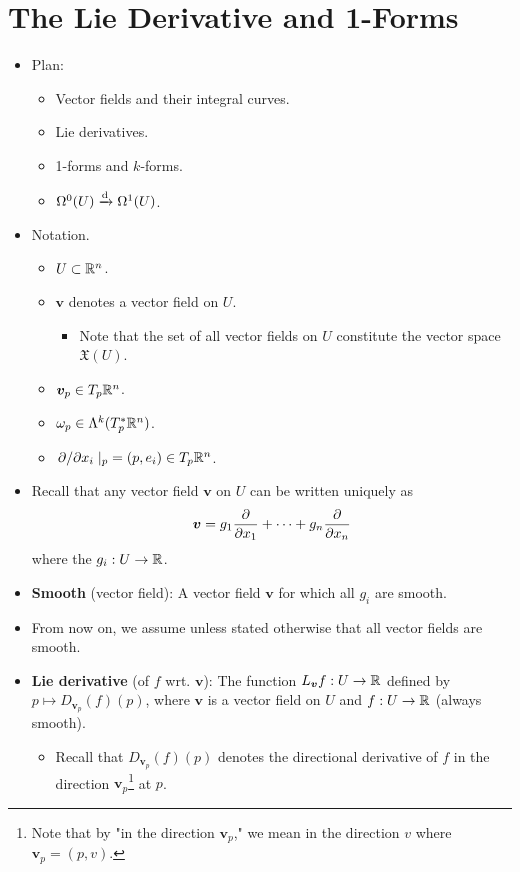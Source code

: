 \documentclass[../notes.tex]{subfiles}
\begin{document}
\section{The Lie Derivative and 1-Forms}
\begin{itemize}
    \item {}Plan:
    \begin{itemize}
        \item Vector fields and their integral curves.
        \item Lie derivatives.
        \item 1-forms and $k$-forms.
        \item $\ome[0]{U}\xrightarrow{\dd}\ome[1]{U}$.
    \end{itemize}
    \item Notation.
    \begin{itemize}
        \item $U\subset\R^n$.
        \item $\bm{v}$ denotes a vector field on $U$.
        \begin{itemize}
            \item Note that the set of all vector fields on $U$ constitute the vector space $\mathfrak{X}(U)$.
        \end{itemize}
        \item $\bm{v}_p\in T_p\R^n$.
        \item $\omega_p\in\lam[k]{T_p^*\R^n}$.
        \item $\pdv*{x_i}|_p=(p,e_i)\in T_p\R^n$.
    \end{itemize}
    \item Recall that any vector field $\bm{v}$ on $U$ can be written uniquely as
    \begin{equation*}
        \bm{v} = g_1\pdv{x_1}+\cdots+g_n\pdv{x_n}
    \end{equation*}
    where the $g_i:U\to\R$.
    \item \textbf{Smooth} (vector field): A vector field $\bm{v}$ for which all $g_i$ are smooth.
    \item From now on, we assume unless stated otherwise that all vector fields are smooth.
    \item \textbf{Lie derivative} (of $f$ wrt. $\bm{v}$): The function $L_{\bm{v}}f:U\to\R$ defined by $p\mapsto D_{\bm{v}_p}(f)(p)$, where $\bm{v}$ is a vector field on $U$ and $f:U\to\R$ (always smooth).
    \begin{itemize}
        \item Recall that $D_{\bm{v}_p}(f)(p)$ denotes the directional derivative of $f$ in the direction $\bm{v}_p$\footnote{Note that by "in the direction $\bm{v}_p$," we mean in the direction $v$ where $\bm{v}_p=(p,v)$.} at $p$.

\end{itemize}
\end{itemize}
\end{document}
